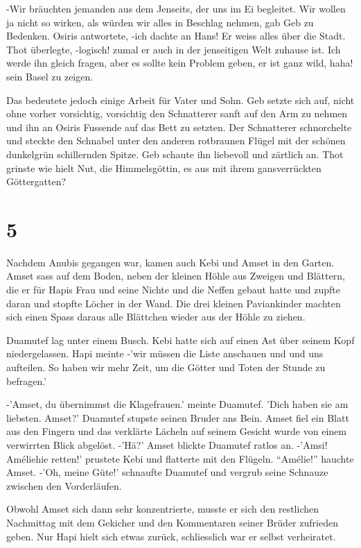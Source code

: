 \documentclass[11pt,titlepage,a5paper]{book}
\begin{document}
-Wir bräuchten jemanden aus dem Jenseits, der uns im Ei begleitet. Wir wollen ja nicht so wirken, als würden wir alles in Beschlag nehmen, gab Geb zu Bedenken. Osiris antwortete, -ich dachte an Hans! Er weiss alles über die Stadt. Thot überlegte, -logisch! zumal er auch in der jenseitigen Welt zuhause ist. Ich werde ihn gleich fragen, aber es sollte kein Problem geben, er ist ganz wild, haha! sein Basel zu zeigen.

Das bedeutete jedoch einige Arbeit für Vater und Sohn. Geb setzte sich auf, nicht ohne vorher vorsichtig, vorsichtig den Schnatterer sanft auf den Arm zu nehmen und ihn an Osiris Fussende auf das Bett zu setzten. Der Schnatterer schnorchelte und steckte den Schnabel unter den anderen rotbraunen Flügel mit der schönen dunkelgrün schillernden Spitze. Geb schaute ihn liebevoll und zärtlich an. Thot grinste wie hielt Nut, die Himmelsgöttin, es aus mit ihrem gansverrückten Göttergatten? 

\section*{5}

Nachdem Anubis gegangen war, kamen auch Kebi und Amset in den Garten. Amset sass auf dem Boden, neben der kleinen Höhle aus Zweigen und Blättern, die er für Hapis Frau und seine Nichte und die Neffen gebaut hatte und zupfte daran und stopfte Löcher in der Wand. Die drei kleinen Paviankinder machten sich einen Spass daraus alle Blättchen wieder aus der Höhle zu ziehen. 

Duamutef lag unter einem Busch. Kebi hatte sich auf einen Ast über seinem Kopf niedergelassen. Hapi meinte -'wir müssen die Liste anschauen und und uns aufteilen. So haben wir mehr Zeit, um die Götter und Toten der Stunde zu befragen.'

-'Amset, du übernimmst die Klagefrauen.' meinte Duamutef. 'Dich haben sie am liebsten. Amset?' Duamutef stupste seinen Bruder ans Bein. Amset fiel ein Blatt aus den Fingern und das verklärte Lächeln auf seinem Gesicht wurde von einem verwirrten Blick abgelöst. -'Hä?' Amset blickte Duamutef ratlos an. -'Amsi! Améliehie retten!' prustete Kebi und flatterte mit den Flügeln. "`Amélie!"' hauchte Amset. -'Oh, meine Güte!' schnaufte Duamutef und vergrub seine Schnauze zwischen den Vorderläufen. 

Obwohl Amset sich dann sehr konzentrierte, musste er sich den restlichen Nachmittag mit dem Gekicher und den Kommentaren seiner Brüder zufrieden geben. Nur Hapi hielt sich etwas zurück, schliesslich war er selbst verheiratet. 
\end{document}
